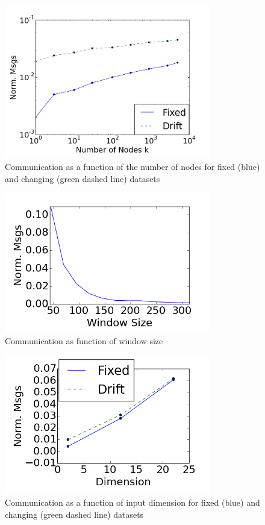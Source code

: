 \documentclass{vldb}
\begin{document}
\begin{figure}[]
\centering
    \centering
  \includegraphics[width=90mm]{graphics/Nodes.png}
  \caption{Communication as a function of the number of nodes for fixed (blue)
  and changing (green dashed line) datasets}\label{Nodes}
  \end{figure}
 \begin{figure}[]
\centering
  \includegraphics[width=90mm]{graphics/WindowSize.png}
  \caption{Communication as function of window size }\label{WindowSize}
  \end{figure}
  
  \begin{figure}[]
\centering
  \includegraphics[width=90mm]{graphics/Dimension.png}
  \caption{Communication as a function of input dimension for fixed (blue) and
  changing (green  dashed line) datasets}\label{Dimension}
\end{figure}
\end{document}
